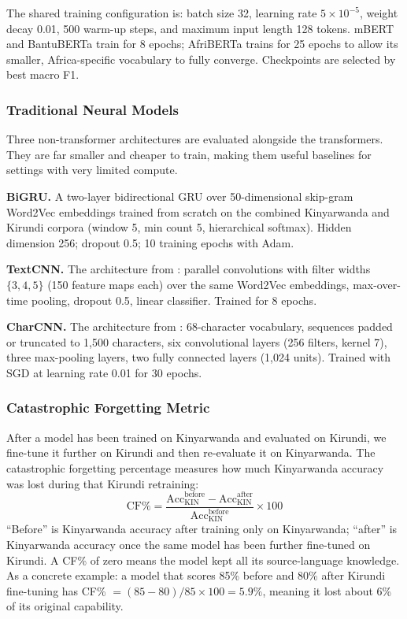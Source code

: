 \documentclass[conference]{IEEEtran}
\begin{document}
The shared training configuration is: batch size 32, learning rate
$5 \times 10^{-5}$, weight decay 0.01, 500 warm-up steps, and maximum
input length 128 tokens. mBERT and BantuBERTa train for 8 epochs;
AfriBERTa trains for 25 epochs to allow its smaller, Africa-specific
vocabulary to fully converge. Checkpoints are selected by best macro F1.

\subsubsection{Traditional Neural Models}
Three non-transformer architectures are evaluated alongside the
transformers. They are far smaller and cheaper to train, making them
useful baselines for settings with very limited compute.

\textbf{BiGRU.} A two-layer bidirectional GRU \cite{b_cho} over
50-dimensional skip-gram Word2Vec embeddings \cite{b_mikolov} trained
from scratch on the combined Kinyarwanda and Kirundi corpora (window 5,
min count 5, hierarchical softmax). Hidden dimension 256; dropout 0.5;
10 training epochs with Adam.

\textbf{TextCNN.} The architecture from \cite{b_kim}: parallel
convolutions with filter widths $\{3, 4, 5\}$ (150 feature maps each)
over the same Word2Vec embeddings, max-over-time pooling, dropout 0.5,
linear classifier. Trained for 8 epochs.

\textbf{CharCNN.} The architecture from \cite{b_zhang}: 68-character
vocabulary, sequences padded or truncated to 1,500 characters, six
convolutional layers (256 filters, kernel 7), three max-pooling layers,
two fully connected layers (1,024 units). Trained with SGD at
learning rate 0.01 for 30 epochs.

\subsubsection{Catastrophic Forgetting Metric}
After a model has been trained on Kinyarwanda and evaluated on Kirundi,
we fine-tune it further on Kirundi and then re-evaluate it on Kinyarwanda.
The catastrophic forgetting percentage measures how much Kinyarwanda
accuracy was lost during that Kirundi retraining:
\begin{equation}
    \text{CF\%} = \frac{
      \text{Acc}_{\text{KIN}}^{\text{before}} -
      \text{Acc}_{\text{KIN}}^{\text{after}}
    }{
      \text{Acc}_{\text{KIN}}^{\text{before}}
    } \times 100
    \label{eq:cf}
\end{equation}
``Before'' is Kinyarwanda accuracy after training only on Kinyarwanda;
``after'' is Kinyarwanda accuracy once the same model has been further
fine-tuned on Kirundi. A CF\% of zero means the model kept all its
source-language knowledge. As a concrete example: a model that scores
85\% before and 80\% after Kirundi fine-tuning has
CF\% $= (85 - 80)/85 \times 100 = 5.9\%$, meaning it lost about 6\%
of its original capability.
\end{document}
